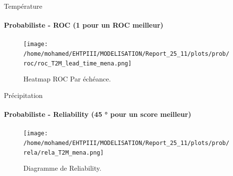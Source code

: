 \begin{frame}{Température}
\framesubtitle{Probabiliste - ROC (1 pour un ROC meilleur)}

\begin{figure}
    \centering
    \texttt{[image: /home/mohamed/EHTPIII/MODELISATION/Report\_25\_11/plots/prob/roc/roc\_T2M\_lead\_time\_mena.png]}
    \caption{Heatmap ROC  Par échéance.}
    \label{fig:enter-label}
\end{figure}
\end{frame}

\begin{frame}{Précipitation}
\framesubtitle{Probabiliste - Reliability (45 ° pour un score meilleur)}

\begin{figure}
    \centering
    \texttt{[image: /home/mohamed/EHTPIII/MODELISATION/Report\_25\_11/plots/prob/rela/rela\_T2M\_mena.png]}
    \caption{Diagramme de Reliability.}
    \label{fig:enter-label}
\end{figure}
\end{frame}
